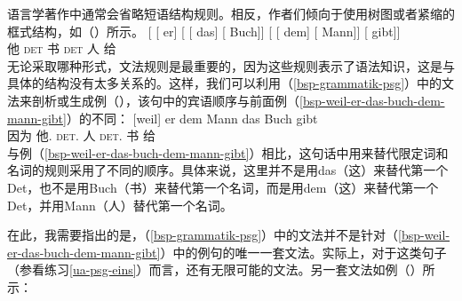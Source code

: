 语言学著作中通常会省略短语结构规则。相反，作者们倾向于使用树图或者紧缩的框式结构，如（）所示。
\ea
\gll {}[ [ er] [ [ das] [ Buch]]  [ [ dem] [ Mann]] [ gibt]]\\
     {}         {}       他  {}        {}       \textsc{det}  {}      书    {}        {}       \textsc{det}  {}       人     {}      给\\  
\z
无论采取哪种形式，文法规则是最重要的，因为这些规则表示了语法知识，这是与具体的结构没有太多关系的。这样，我们可以利用（\ref{bsp-grammatik-psg}）中的文法来剖析或生成例（），该句中的宾语顺序与前面例（\ref{bsp-weil-er-das-buch-dem-mann-gibt}）的不同：
\ea
\gll {}[weil] er dem Mann das Buch gibt\\
	 {}\spacebr{}因为 他.\nom{} \textsc{det}.\dat{} 人 \textsc{det}.\acc{} 书 给\\
\z
与例（\ref{bsp-weil-er-das-buch-dem-mann-gibt}）相比，这句话中用来替代限定词和名词的规则采用了不同的顺序。具体来说，这里并不是用das（这）来替代第一个Det，也不是用Buch（书）来替代第一个名词，而是用dem（这）来替代第一个Det，并用Mann（人）替代第一个名词。

在此，我需要指出的是，（\ref{bsp-grammatik-psg}）中的文法并不是针对（\ref{bsp-weil-er-das-buch-dem-mann-gibt}）中的例句的唯一一套文法。实际上，对于这类句子（参看练习\ref{ua-psg-eins}）而言，还有无限\label{page-unendlich-viele-grammatiken}可能的文法。另一套文法如例（）所示：


